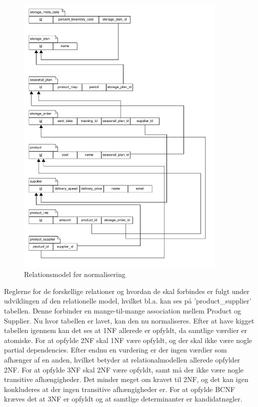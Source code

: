 \begin{figure}[H]
    \centering
    \includegraphics[width=0.9\textwidth]{figures/krav/relation_model_0th_normalization.png}
    \caption{Relationsmodel før normalisering}
    \label{fig:relational_model_0}
\end{figure}



Reglerne for de forskellige relationer og hvordan de skal forbindes er fulgt under udviklingen af den relationelle model, hvilket bl.a. kan ses på 'product\_supplier' tabellen. Denne forbinder en mange-til-mange association mellem Product og Supplier. 
Nu hvor tabellen er lavet, kan den nu normaliseres.
Efter at have kigget tabellen igennem kan det ses at 1NF allerede er opfyldt, da samtlige værdier er atomiske.
For at opfylde 2NF skal 1NF være opfyldt, og der skal ikke være nogle partial dependencies. Efter endnu en vurdering er der ingen værdier som afhænger af en anden, hvilket betyder at relationalmodellen allerede opfylder 2NF.
For at opfylde 3NF skal 2NF være opfyldt, samt må der ikke være nogle transitive afhængigheder. Det minder meget om kravet til 2NF, og det kan igen konkluderes at der ingen transitive afhængigheder er.
For at opfylde BCNF kræves det at 3NF er opfyldt og at samtlige determinanter er kandidatnøgler.


